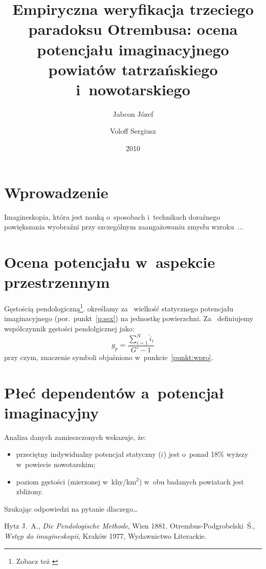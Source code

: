 \documentclass[a4paper]{article}
\title{Empiryczna weryfikacja trzeciego paradoksu Otrembusa:
  ocena potencjału imaginacyjnego powiatów tatrzańskiego i~nowotarskiego}
\author{Jabcon Józef \and Voloff Sergiusz} \date{2010}
\renewcommand{\|}{\kern.12em}
\begin{document}
\maketitle %

\section {Wprowadzenie \label{punkt:wpro}}
Imagineskopia, która jest nauką o~sposobach i~technikach doraźnego 
powiększania wyobraźni przy 
szczególnym zaangażowaniu zmysłu wzroku~\cite[s.~34]{Otrembus-1977}...

\section{Ocena potencjału w~aspekcie przestrzennym}
Gęstością pendologiczną\footnote{%
Zobacz też \cite{hytz-pendologische}}.
określamy za~\cite{Otrembus-1977} wielkość 
statycznego potencjału imaginacyjnego (por.~punkt~\ref{p:sex}) na 
jednostkę powierzchni. Za~\cite{hytz-pendologische} definiujemy 
współczynnik gęstości pendolgicznej jako:
\begin{equation}  g_p = \frac{\sum_{i=1}^{N} \hat i_i}{ G' -1 } 
\end{equation}
przy czym, znaczenie symboli objaśniono w~punkcie~\ref{punkt:wpro}. 

\section{Płeć dependentów a~potencjał imaginacyjny \label{p:sex}}

Analiza danych zamieszczonych wskazuje, że:
\begin{itemize}
\item przeciętny indywidualny potencjał statyczny ($\bar \iota$) 
 jest o~ponad 18\% wyższy w~powiecie nowotarskim;
\item poziom gęstości (mierzonej w~khy/km$^2$) w~obu 
 badanych powiatach jest zbliżony.
\end{itemize}
Szukając odpowiedzi na pytanie dlaczego\dots

\begin{thebibliography}{1}
 Hytz J.~A., 
     \emph{Die Pendologische Methode}, Wien 1881.
 Otrembus-Podgrobelski~Ś.,
\emph{Wstęp do imagineskopii}, Kraków 1977, Wydawnictwo Literackie.
\end{thebibliography}
\end{document}
